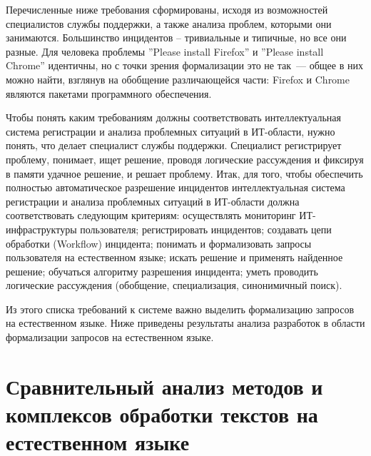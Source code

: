 Перечисленные ниже требования сформированы, исходя из возможностей специалистов службы поддержки, а также анализа проблем, которыми они занимаются. Большинство инцидентов – тривиальные и типичные, но все они разные. Для человека проблемы ”Please install Firefox” и ”Please install Chrome” идентичны, но с точки зрения формализации это не так~--- общее в них можно найти, взглянув на обобщение различающейся части: Firefox и Chrome являются пакетами программного обеспечения. \par 
Чтобы понять каким требованиям должны соответствовать интеллектуальная система регистрации и анализа проблемных ситуаций в ИТ-области, нужно понять, что делает специалист службы поддержки. Специалист регистрирует проблему, понимает, ищет решение, проводя логические рассуждения и фиксируя в памяти удачное решение, и решает проблему. Итак, для того, чтобы обеспечить полностью автоматическое разрешение инцидентов интеллектуальная система регистрации и анализа проблемных ситуаций в ИТ-области должна соответствовать следующим критериям: осуществлять мониторинг ИТ-инфраструктуры пользователя; регистрировать инцидентов; создавать цепи обработки (Workflow) инцидента; понимать и формализовать запросы пользователя на естественном языке; искать решение и применять найденное решение; обучаться алгоритму разрешения инцидента; уметь проводить логические рассуждения (обобщение, специализация, синонимичный поиск). \par
Из этого списка требований к системе важно выделить формализацию запросов на естественном языке. Ниже приведены результаты анализа разработок в области формализации запросов на естественном языке. 

\clearpage

\section{Сравнительный анализ методов и комплексов обработки текстов на естественном языке}


